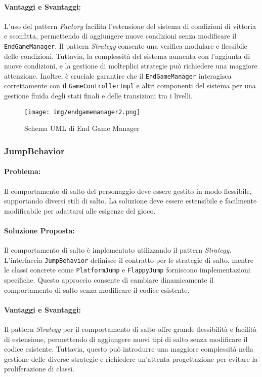 \documentclass[a4paper,12pt]{report}
\begin{document}
	\paragraph{Vantaggi e Svantaggi:} 
	L'uso del pattern \textit{Factory} facilita l'estensione del sistema di condizioni di vittoria e sconfitta, permettendo di aggiungere nuove condizioni senza modificare il \texttt{EndGameManager}. Il pattern \textit{Strategy} consente una verifica modulare e flessibile delle condizioni. Tuttavia, la complessità del sistema aumenta con l'aggiunta di nuove condizioni, e la gestione di molteplici strategie può richiedere una maggiore attenzione. Inoltre, è cruciale garantire che il \texttt{EndGameManager} interagisca correttamente con il \texttt{GameControllerImpl} e altri componenti del sistema per una gestione fluida degli stati finali e delle transizioni tra i livelli.
	
	\begin{figure}[H]
		\centering{}
		\texttt{[image: img/endgamemanager2.png]}
		\caption{Schema UML di End Game Manager}
		\label{img:endgamemanager}
	\end{figure}
	
	\subsubsection{JumpBehavior}
	
	\paragraph{Problema:} Il comportamento di salto del personaggio deve essere gestito in modo flessibile, supportando diversi stili di salto. La soluzione deve essere estensibile e facilmente modificabile per adattarsi alle esigenze del gioco.
	
	\paragraph{Soluzione Proposta:} Il comportamento di salto è implementato utilizzando il pattern \textit{Strategy}. L'interfaccia \texttt{JumpBehavior} definisce il contratto per le strategie di salto, mentre le classi concrete come \texttt{PlatformJump} e \texttt{FlappyJump} forniscono implementazioni specifiche. Questo approccio consente di cambiare dinamicamente il comportamento di salto senza modificare il codice esistente.
	
	\paragraph{Vantaggi e Svantaggi:} 
	Il pattern \textit{Strategy} per il comportamento di salto offre grande flessibilità e facilità di estensione, permettendo di aggiungere nuovi tipi di salto senza modificare il codice esistente. Tuttavia, questo può introdurre una maggiore complessità nella gestione delle diverse strategie e richiedere un'attenta progettazione per evitare la proliferazione di classi.
	
\end{document}
